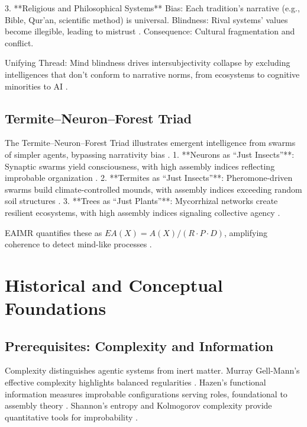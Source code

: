 \documentclass{article}
\begin{document}
3. **Religious and Philosophical Systems**  
   Bias: Each tradition’s narrative (e.g., Bible, Qur’an, scientific method) is universal.  
   Blindness: Rival systems’ values become illegible, leading to mistrust \citep{habermas1984theory}.  
   Consequence: Cultural fragmentation and conflict.

Unifying Thread: Mind blindness drives intersubjectivity collapse by excluding intelligences that don’t conform to narrative norms, from ecosystems to cognitive minorities to AI \citep{cabrera2013human}.

\subsection{Termite–Neuron–Forest Triad}
The Termite–Neuron–Forest Triad illustrates emergent intelligence from swarms of simpler agents, bypassing narrativity bias \citep{levin2022technological}.
1. **Neurons as “Just Insects”**: Synaptic swarms yield consciousness, with high assembly indices reflecting improbable organization \citep{gallese1998mirror}.
2. **Termites as “Just Insects”**: Pheromone-driven swarms build climate-controlled mounds, with assembly indices exceeding random soil structures \citep{turner2000extended}.
3. **Trees as “Just Plants”**: Mycorrhizal networks create resilient ecosystems, with high assembly indices signaling collective agency \citep{camazine2001self}.

EAIMR quantifies these as \(EA(X) = A(X) / (R \cdot P \cdot D)\), amplifying coherence to detect mind-like processes \citep{walker2013algorithmic}.

\section{Historical and Conceptual Foundations}
\label{sec:foundations}

\subsection{Prerequisites: Complexity and Information}
Complexity distinguishes agentic systems from inert matter. Murray Gell-Mann’s effective complexity highlights balanced regularities \citep{adami2012use}. Hazen’s functional information measures improbable configurations serving roles, foundational to assembly theory \citep{hazen2007functional}. Shannon’s entropy and Kolmogorov complexity provide quantitative tools for improbability \citep{shannon1948mathematical, kolmogorov1965three}.
\end{document}
